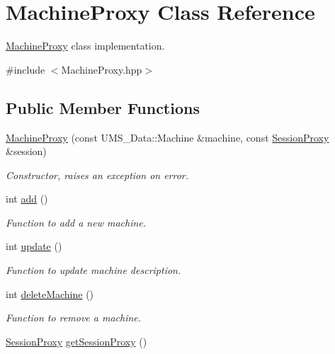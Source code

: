 \hypertarget{classMachineProxy}{
\section{MachineProxy Class Reference}
\label{classMachineProxy}
}


\hyperlink{classMachineProxy}{MachineProxy} class implementation.  




{\ttfamily \#include $<$MachineProxy.hpp$>$}

\subsection*{Public Member Functions}
\begin{DoxyCompactItemize}
\item 
\hyperlink{classMachineProxy_ad962488b15a5d0df42d65cfb1e6dcd1f}{MachineProxy} (const UMS\_\-Data::Machine \&machine, const \hyperlink{classSessionProxy}{SessionProxy} \&session)
\begin{DoxyCompactList}\small\item\em Constructor, raises an exception on error. \item\end{DoxyCompactList}\item 
int \hyperlink{classMachineProxy_acbfe39a46b5f5732a618bee9adac01cf}{add} ()
\begin{DoxyCompactList}\small\item\em Function to add a new machine. \item\end{DoxyCompactList}\item 
int \hyperlink{classMachineProxy_a8f6da838e0046c0590a94835f72ec897}{update} ()
\begin{DoxyCompactList}\small\item\em Function to update machine description. \item\end{DoxyCompactList}\item 
int \hyperlink{classMachineProxy_aeb3283c41deeb9a61c9dc95afd2f661b}{deleteMachine} ()
\begin{DoxyCompactList}\small\item\em Function to remove a machine. \item\end{DoxyCompactList}\item 
\hyperlink{classSessionProxy}{SessionProxy} \hyperlink{classMachineProxy_a188a6684133e9e019f30efae8cedb72b}{getSessionProxy} ()

\end{DoxyCompactItemize}
